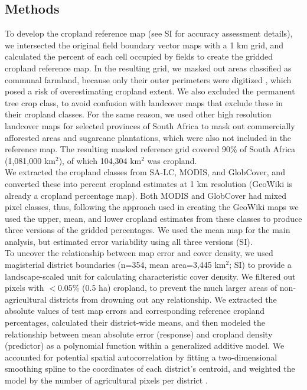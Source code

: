 \documentclass{pnastwo}
\begin{document}
\begin{article}



\begin{materials}
\section{Methods} 
To develop the cropland reference map (see SI for accuracy assessment details), we intersected the original field boundary vector maps with a 1 km grid, and calculated the percent of each cell occupied by fields to create the gridded cropland reference map. In the resulting grid, we masked out areas classified as communal farmland, because only their outer perimeters were digitized \cite{fourie_better_2009}, which posed a risk of overestimating cropland extent. We also excluded the permanent tree crop class, to avoid confusion with landcover maps that exclude these in their cropland classes. For the same reason, we used other high resolution landcover maps for selected provinces of South Africa to mask out commercially afforested areas and sugarcane plantations, which were also not included in the reference map. The resulting masked reference grid covered 90\% of South Africa (1,081,000 km$^2$), of which 104,304 km$^2$ was cropland.\\
\indent We extracted the cropland classes from SA-LC, MODIS, and GlobCover, and converted these into percent cropland estimates at 1 km resolution (GeoWiki is already a cropland percentage map). Both MODIS and GlobCover had mixed pixel classes, thus, following the approach used in creating the GeoWiki maps \cite{fritz_mapping_2015} we used the upper, mean, and lower cropland estimates from these classes to produce three versions of the gridded percentages. We used the mean map for the main analysis, but estimated error variability using all three versions (SI).\\  
\indent To uncover the relationship between map error and cover density, we used magisterial district boundaries (n=354, mean area=3,445 km$^2$; SI) to provide a landscape-scaled unit for calculating characteristic cover density. We filtered out pixels with $<$0.05\% (0.5 ha) cropland, to prevent the much larger areas of non-agricultural districts from drowning out any relationship. We extracted the absolute values of test map errors and corresponding reference cropland percentages, calculated their district-wide means, and then modeled the relationship between mean absolute error (response) and cropland density (predictor) as a polynomial function within a generalized additive model. We accounted for potential spatial autocorrelation by fitting a two-dimensional smoothing spline to the coordinates of each district's centroid, and weighted the model by the number of agricultural pixels per district \cite{wood_mgcv:_2001}.\\   

\end{materials}
\end{article}
\end{document}
